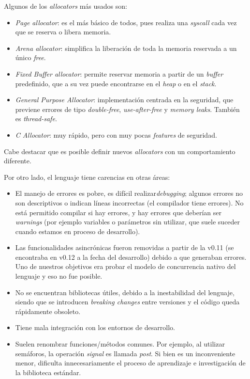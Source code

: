 \documentclass[11pt]{article}
\newcommand{\english}[1]{\textit{#1}}
\begin{document}
Algunos de los \english{allocators} más usados son:

\begin{itemize}
    \item \english{Page allocator}: es el más básico de todos, pues realiza una \english{syscall} cada vez que se reserva o libera memoria.
    \item \english{Arena allocator}: simplifica la liberación de toda la memoria reservada a un único \english{free}.
    \item \english{Fixed Buffer allocator}: permite reservar memoria a partir de un \english{buffer} predefinido, que a su vez puede encontrarse en el \english{heap} o en el \english{stack}.
    \item \english{General Purpose Allocator}: implementación centrada en la seguridad, que previene errores de tipo \english{double-free}, \english{use-after-free} y \english{memory leaks}. También es \english{thread-safe}.
    \item \english{C Allocator}: muy rápido, pero con muy pocas \english{features} de seguridad.
\end{itemize}

Cabe destacar que es posible definir nuevos \english{allocators} con un comportamiento diferente.

Por otro lado, el lenguaje tiene carencias en otras áreas:


\begin{itemize}
    \item El manejo de errores es pobre, es difícil realizar\english{debugging}; algunos errores no son descriptivos o indican líneas incorrectas (el compilador tiene errores). No está permitido compilar si hay errores, y hay errores que deberían ser \english{warnings} (por ejemplo variables o parámetros sin utilizar, que suele suceder cuando estamos en proceso de desarrollo).
    \item Las funcionalidades asincrónicas fueron removidas a partir de la v0.11 (se encontraba en v0.12 a la fecha del desarrollo) debido a que generaban errores. Uno de nuestros objetivos era probar el modelo de concurrencia nativo del lenguaje y eso no fue posible.
    \item No se encuentran bibliotecas útiles, debido a la inestabilidad del lenguaje, siendo que se introducen \english{breaking changes} entre versiones y el código queda rápidamente obsoleto.
    \item Tiene mala integración con los entornos de desarrollo.
    \item Suelen renombrar funciones/métodos comunes. Por ejemplo, al utilizar semáforos, la operación \english{signal} es llamada \english{post}. Si bien es un inconveniente menor, dificulta innecesariamente el proceso de aprendizaje e investigación de la biblioteca estándar.
\end{itemize}
\end{document}

